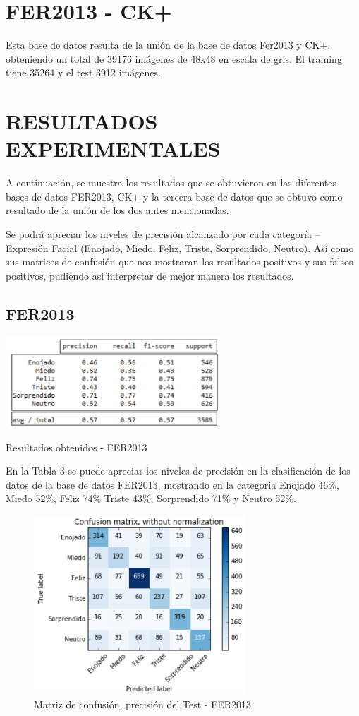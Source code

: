 \section{FER2013 - CK+}
Esta base de datos resulta de la unión de la base de datos Fer2013 y CK+,
obteniendo un total de 39176 imágenes de 48x48 en escala de gris. El training tiene 35264
y el test 3912 imágenes.

\section{RESULTADOS EXPERIMENTALES}
A continuación, se muestra los resultados que se obtuvieron en las diferentes bases
de datos FER2013, CK+ y la tercera base de datos que se obtuvo como resultado de la
unión de los dos antes mencionadas.

Se podrá apreciar los niveles de precisión alcanzado por cada categoría –
Expresión Facial (Enojado, Miedo, Feliz, Triste, Sorprendido, Neutro). Así como sus
matrices de confusión que nos mostraran los resultados positivos y sus falsos positivos,
pudiendo así interpretar de mejor manera los resultados.

\subsection{FER2013}

\begin{table}[H]
    \centering
    \includegraphics[width=80mm]{./Imagenes/tabla_resultados_fer.png} 
    \caption{Resultados obtenidos - FER2013}
    \label{tab:tabla_resultados_fer}
\end{table}

En la Tabla 3 se puede apreciar los niveles de precisión en la clasificación de los
datos de la base de datos FER2013, mostrando en la categoría Enojado 46\%, Miedo 52\%,
Feliz 74\% Triste 43\%, Sorprendido 71\% y Neutro 52\%.

\begin{figure}[H]
		\centering
		\includegraphics[width=80mm]{./Imagenes/matriz_confusion_fer.png}
		\caption{Matriz de confusión, precisión del Test - FER2013}
		\label{fig:matriz_confusion_fer}
\end{figure}


